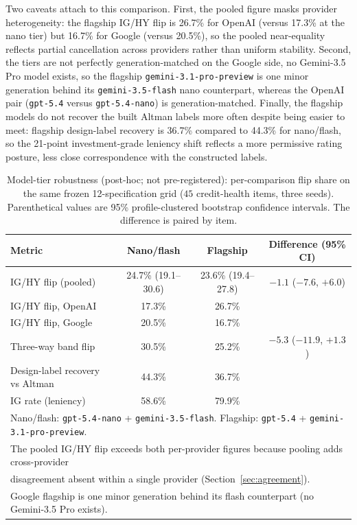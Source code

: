\documentclass[a4paper,fleqn]{cas-sc}
\begin{document}
Two caveats attach to this comparison. First, the pooled figure masks provider heterogeneity: the
flagship IG/HY flip is 26.7\% for OpenAI (versus 17.3\% at the nano tier) but 16.7\% for Google (versus
20.5\%), so the pooled near-equality reflects partial cancellation across providers rather than uniform
stability. Second, the tiers are not perfectly generation-matched on the Google side, no Gemini-3.5 Pro
model exists, so the flagship \texttt{gemini-3.1-pro-preview} is one minor generation behind its
\texttt{gemini-3.5-flash} nano counterpart, whereas the OpenAI pair (\texttt{gpt-5.4} versus
\texttt{gpt-5.4-nano}) is generation-matched. Finally, the flagship models do not recover the built
Altman labels more often despite being easier to meet: flagship design-label recovery is 36.7\% compared to 44.3\% for
nano/flash, so the 21-point investment-grade leniency shift reflects a more permissive rating posture,
less close correspondence with the constructed labels.

\begin{table}[t]\centering
\caption{Model-tier robustness (post-hoc; not pre-registered): per-comparison flip share on the same
frozen 12-specification grid ($45$ credit-health items, three seeds). Parenthetical values are 95\%
profile-clustered bootstrap confidence intervals. The difference is paired by item.}
\label{tab:tier}
\begin{tabular}{lccc}\toprule
Metric & Nano/flash & Flagship & Difference (95\% CI) \\\midrule
IG/HY flip (pooled) & 24.7\% (19.1--30.6) & 23.6\% (19.4--27.8) & $-1.1$ ($-7.6$, $+6.0$) \\
\quad IG/HY flip, OpenAI & 17.3\% & 26.7\% & \\
\quad IG/HY flip, Google & 20.5\% & 16.7\% & \\
Three-way band flip & 30.5\% & 25.2\% & $-5.3$ ($-11.9$, $+1.3$) \\\midrule
Design-label recovery vs Altman & 44.3\% & 36.7\% & \\
IG rate (leniency) & 58.6\% & 79.9\% & \\\midrule
\multicolumn{4}{l}{Nano/flash: \texttt{gpt-5.4-nano} + \texttt{gemini-3.5-flash}. Flagship: \texttt{gpt-5.4} + \texttt{gemini-3.1-pro-preview}.}\\
\multicolumn{4}{l}{The pooled IG/HY flip exceeds both per-provider figures because pooling adds cross-provider}\\
\multicolumn{4}{l}{disagreement absent within a single provider (Section~\ref{sec:agreement}).}\\
\multicolumn{4}{l}{Google flagship is one minor generation behind its flash counterpart (no Gemini-3.5 Pro exists).}\\\bottomrule
\end{tabular}\end{table}
\end{document}
